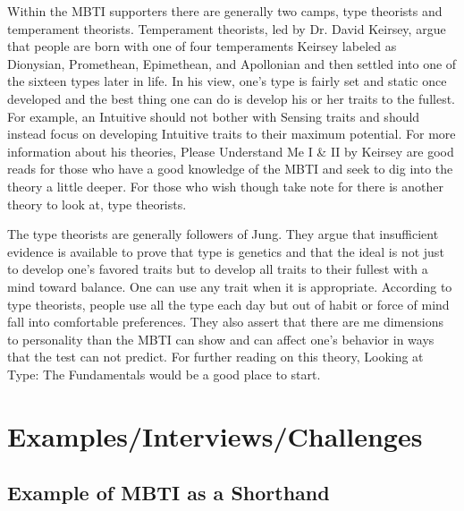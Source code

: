 Within the MBTI supporters there are generally two camps, type theorists and temperament theorists. Temperament theorists, led by Dr. David Keirsey, argue that people are born with one of four temperaments Keirsey labeled as Dionysian, Promethean, Epimethean, and Apollonian and then settled into one of the sixteen types later in life. In his view, one's type is fairly set and static once developed and the best thing one can do is develop his or her traits to the fullest. For example, an Intuitive should not bother with Sensing traits and should instead focus on developing Intuitive traits to their maximum potential. For more information about his theories, Please Understand Me I \& II by Keirsey are good reads for those who have a good knowledge of the MBTI and seek to dig into the theory a little deeper. For those who wish though take note for there is another theory to look at, type theorists. 

The type theorists are generally followers of Jung. They argue that insufficient evidence is available to prove that type is genetics and that the ideal is not just to develop one's favored traits but to develop all traits to their fullest with a mind toward balance. One can use any trait when it is appropriate. According to type theorists, people use all the type each day but out of habit or force of mind fall into comfortable preferences. They also assert that there are me dimensions to personality than the MBTI can show and can affect one's behavior in ways that the test can not predict. For further reading on this theory, Looking at Type: The Fundamentals would be a good place to start.

\section{Examples/Interviews/Challenges}

\subsection{Example of MBTI as a Shorthand}

